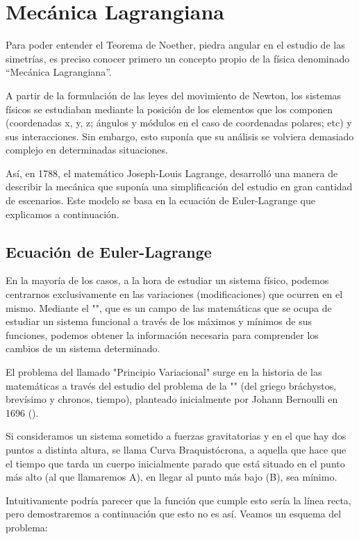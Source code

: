 \chapter{Mecánica Lagrangiana}\label{ch:mecanica-lagrangiana}
Para poder entender el Teorema de Noether, piedra angular en el estudio de las simetrías, es preciso conocer primero un concepto propio de la física denominado \textquotedblleft Mecánica Lagrangiana\textquotedblright.

A partir de la formulación de las leyes del movimiento de Newton, los sistemas físicos se estudiaban mediante la posición de los elementos que los componen (coordenadas x, y, z; ángulos y módulos en el caso de coordenadas polares; etc) y sus interacciones.
Sin embargo, esto suponía que su análisis se volviera demasiado complejo en determinadas situaciones.

Así, en 1788, el matemático Joseph-Louis Lagrange, desarrolló una manera de describir la mecánica que suponía una simplificación del estudio en gran cantidad de escenarios. Este modelo se basa en la ecuación de Euler-Lagrange que explicamos a continuación.
\section{Ecuación de Euler-Lagrange}\label{sec:ecuacion-de-euler-lagrange}
En la mayoría de los casos, a la hora de estudiar un sistema físico, podemos centrarnos exclusivamente en las variaciones (modificaciones) que ocurren en el mismo. Mediante el "", que es un campo de las matemáticas que se ocupa de estudiar un sistema funcional a través de los máximos y mínimos de sus funciones, podemos obtener la información necesaria para comprender los cambios de un sistema determinado.

El problema del llamado "Principio Variacional" surge en la historia de las matemáticas a través del estudio del problema de la "" (del griego bráchystos, brevísimo y chronos, tiempo), planteado inicialmente por Johann Bernoulli en 1696 (\cite{AE}).

Si consideramos un sistema sometido a fuerzas gravitatorias y en el que hay dos puntos a distinta altura, se llama Curva Braquistócrona, a aquella que hace que el tiempo que tarda un cuerpo inicialmente parado que está situado en el punto más alto (al que llamaremos A), en llegar al punto más bajo (B), sea mínimo.

Intuitivamente podría parecer que la función que cumple esto sería la línea recta, pero demostraremos a continuación que esto no es así. Veamos un esquema del problema:

